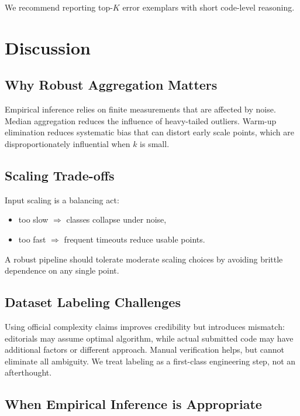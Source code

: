 \documentclass[conference]{IEEEtran}
\begin{document}
We recommend reporting top-$K$ error exemplars with short code-level reasoning.

\section{Discussion}

\subsection{Why Robust Aggregation Matters}

Empirical inference relies on finite measurements that are affected by noise.
Median aggregation reduces the influence of heavy-tailed outliers.
Warm-up elimination reduces systematic bias that can distort early scale points,
which are disproportionately influential when $k$ is small.

\subsection{Scaling Trade-offs}

Input scaling is a balancing act:
\begin{itemize}[leftmargin=1.2em]
\item too slow $\Rightarrow$ classes collapse under noise,
\item too fast $\Rightarrow$ frequent timeouts reduce usable points.
\end{itemize}
A robust pipeline should tolerate moderate scaling choices by avoiding brittle
dependence on any single point.

\subsection{Dataset Labeling Challenges}

Using official complexity claims improves credibility but introduces mismatch:
editorials may assume optimal algorithm, while actual submitted code may have
additional factors or different approach.
Manual verification helps, but cannot eliminate all ambiguity.
We treat labeling as a first-class engineering step, not an afterthought.

\subsection{When Empirical Inference is Appropriate}
\end{document}
